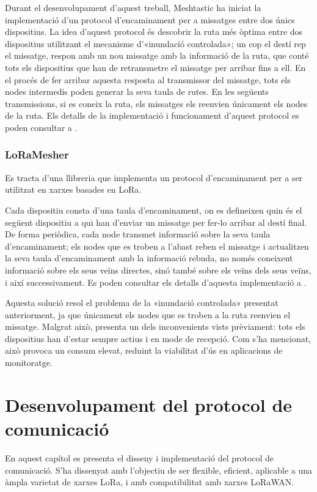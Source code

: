 \documentclass{tfgitic}[2024/07/01]
\begin{document}
Durant el desenvolupament d'aquest treball, Meshtastic ha iniciat la implementació d'un protocol d'encaminament per a missatges entre dos únics dispositius. La idea d'aquest protocol és descobrir la ruta més òptima entre dos dispositius utilitzant el mecanisme d'«inundació controlada»; un cop el destí rep el missatge, respon amb un nou missatge amb la informació de la ruta, que conté tots els dispositius que han de retransmetre el missatge per arribar fins a ell. En el procés de fer arribar aquesta resposta al transmissor del missatge, tots els nodes intermedis poden generar la seva taula de rutes. En les següents transmissions, si es coneix la ruta, els missatges els reenvien únicament els nodes de la ruta. Els detalls de la implementació i funcionament d'aquest protocol es poden consultar a \cite{open_source_mesh_nodate}.

\subsection{LoRaMesher}
Es tracta d'una llibreria que implementa un protocol d'encaminament per a ser utilitzat en xarxes basades en LoRa. 

Cada dispositiu consta d'una taula d'encaminament, on es defineixen quin és el següent dispositiu a qui han d'enviar un missatge per fer-lo arribar al destí final. De forma periòdica, cada node transmet informació sobre la seva taula d'encaminament; els nodes que es troben a l'abast reben el missatge i actualitzen la seva taula d'encaminament amb la informació rebuda, no només coneixent informació sobre els seus veïns directes, sinó també sobre els veïns dels seus veïns, i així successivament. Es poden consultar els detalls d'aquesta implementació a \cite{sole_implementation_2022}.

Aquesta solució resol el problema de la «inundació controlada» presentat anteriorment, ja que únicament els nodes que es troben a la ruta reenvien el missatge. Malgrat això, presenta un dels inconvenients vists prèviament: tots els dispositius han d'estar sempre actius i en mode de recepció. Com s'ha mencionat, això provoca un consum elevat, reduint la viabilitat d'ús en aplicacions de monitoratge.

\chapter{Desenvolupament del protocol de comunicació}
En aquest capítol es presenta el disseny i implementació del protocol de comunicació. S'ha dissenyat amb l'objectiu de ser flexible, eficient, aplicable a una àmpla varietat de xarxes LoRa, i amb compatibilitat amb xarxes LoRaWAN. 
\end{document}
